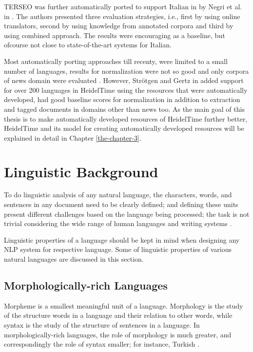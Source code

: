 TERSEO was further automatically ported to support Italian in by Negri et al. in \cite{negri2006evaluating}. The authors presented three evaluation strategies, i.e., first by using online translators, second by using knowledge from annotated corpora and third by using combined approach. The results were encouraging as a baseline, but ofcourse not close to state-of-the-art systems for Italian. 

Most automatically porting approaches till recenty, were limited to a small number of languages, results for normalization were not so good and only corpora of news domain were evaluated \cite{DBLP:series/synthesis/2016Strotgen}. However, Str{\"{o}}tgen and Gertz in \cite{DBLP:conf/emnlp/StrotgenG15} added support for over 200 languages in HeidelTime using the resources that were automatically developed, had good baseline scores for normalization in addition to extraction and tagged documents in domains other than news too. As the main goal of this thesis is to make automatically developed resources of HeidelTime further better, HeidelTime and its model for creating automatically developed resources will be explained in detail in Chapter \ref{the-chapter-3}.

\section{Linguistic Background}
To do linguistic analysis of any natural language, the characters, words, and sentences in any document need to be clearly defined; and defining these units present different challenges based on the language being processed; the task is not trivial considering the wide range of human languages and writing systems \cite{indurkhya2010handbook}.

Linguistic properties of a language should be kept in mind when designing any NLP system for respective language. Some of linguistic properties of various natural languages are discussed in this section. 

\subsection{Morphologically-rich Languages} \label{morphologically-rich-languages-background}
Morpheme is a smallest meaningful unit of a language. Morphology is the study of the structure words in a language and their relation to other words, while syntax is the study of the structure of sentences in a language. In morphologically-rich languages, the role of morphology is much greater, and correspondingly the role of syntax smaller; for instance, Turkish \cite{dressler2003morphological}. 

